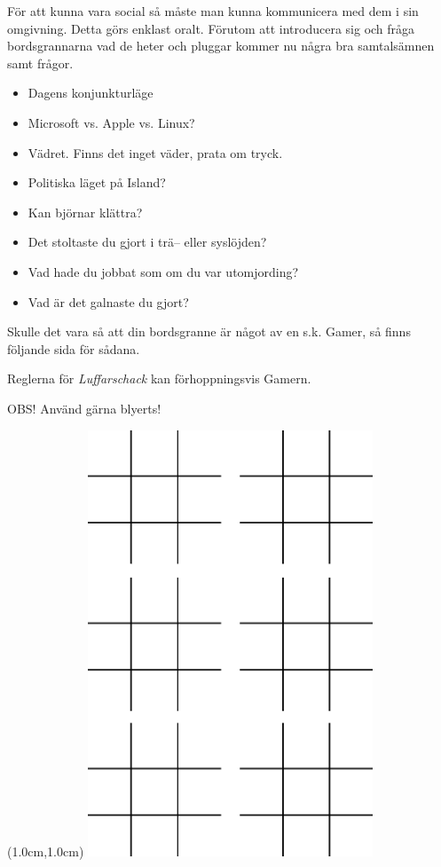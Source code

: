 För att kunna vara social så måste man kunna kommunicera med dem i sin omgivning. 
Detta görs enklast oralt. Förutom att introducera sig och fråga bordsgrannarna vad de 
heter och pluggar kommer nu några bra samtalsämnen samt frågor.
\begin{itemize}[itemsep=0.0em]
  \item Dagens konjunkturläge
  \item Microsoft vs. Apple vs. Linux?
  \item Vädret. Finns det inget väder, prata om tryck.
  \item Politiska läget på Island?
  \item Kan björnar klättra?
  \item Det stoltaste du gjort i trä– eller syslöjden?
  \item Vad hade du jobbat som om du var utomjording?
  \item Vad är det galnaste du gjort?
\end{itemize}


Skulle det vara så att din bordsgranne är något av en s.k. Gamer, så finns följande sida för sådana.

Reglerna för \textit{Luffarschack} kan förhoppningsvis Gamern.

OBS! Använd gärna blyerts!

\newpage

\thispagestyle{plainnohead}

\phantom{osynlig text}

\begin{textblock*}{3cm}(1.0cm,1.0cm) %
   \includegraphics[width=8.5cm]{./bilder/luffarschack.png}
\end{textblock*}


